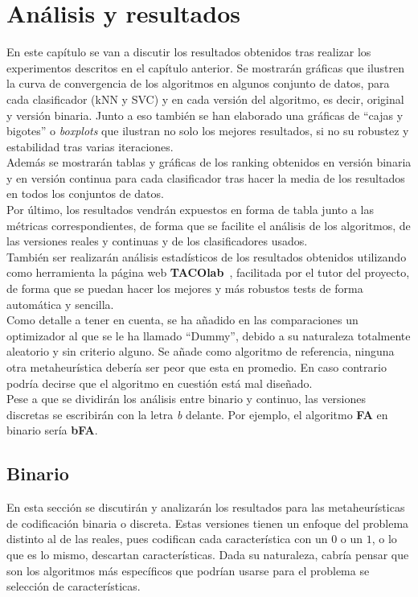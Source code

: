 \chapter{Análisis y resultados}
En este capítulo se van a discutir los resultados obtenidos tras realizar los experimentos descritos en el capítulo anterior. Se mostrarán gráficas que ilustren la curva de convergencia de los algoritmos en algunos conjunto de datos, para cada clasificador (kNN y SVC) y en cada versión del algoritmo, es decir, original y versión binaria. Junto a eso también se han elaborado una gráficas de ``cajas y bigotes'' o \textit{boxplots} que ilustran no solo los mejores resultados, si no su robustez y estabilidad tras varias iteraciones. \\[6pt]
Además se mostrarán tablas y gráficas de los ranking obtenidos en versión binaria y en versión continua para cada clasificador tras hacer la media de los resultados en todos los conjuntos de datos.\\[6pt]
Por último, los resultados vendrán expuestos en forma de tabla junto a las métricas correspondientes, de forma que se facilite el análisis de los algoritmos, de las versiones reales y continuas y de los clasificadores usados.\\[6pt]
También ser realizarán análisis estadísticos de los resultados obtenidos utilizando como herramienta la página web \textbf{TACOlab}~\cite{taco_website}, facilitada por el tutor del proyecto, de forma que se puedan hacer los mejores y más robustos tests de forma automática y sencilla.\\[6pt]
Como detalle a tener en cuenta, se ha añadido en las comparaciones un optimizador al que se le ha llamado ``Dummy'', debido a su naturaleza totalmente aleatorio y sin criterio alguno. Se añade como algoritmo de referencia, ninguna otra metaheurística debería ser peor que esta en promedio. En caso contrario podría decirse que el algoritmo en cuestión está mal diseñado.\\[6pt]
Pese a que se dividirán los análisis entre binario y continuo, las versiones discretas se escribirán con la letra \textit{b} delante. Por ejemplo, el algoritmo \textbf{FA} en binario sería \textbf{bFA}.

\section{Binario}
En esta sección se discutirán y analizarán los resultados para las metaheurísticas de codificación binaria o discreta. Estas versiones tienen un enfoque del problema distinto al de las reales, pues codifican cada característica con un $0$ o un $1$, o lo que es lo mismo, descartan características. Dada su naturaleza, cabría pensar que son los algoritmos más específicos que podrían usarse para el problema se selección de características.

